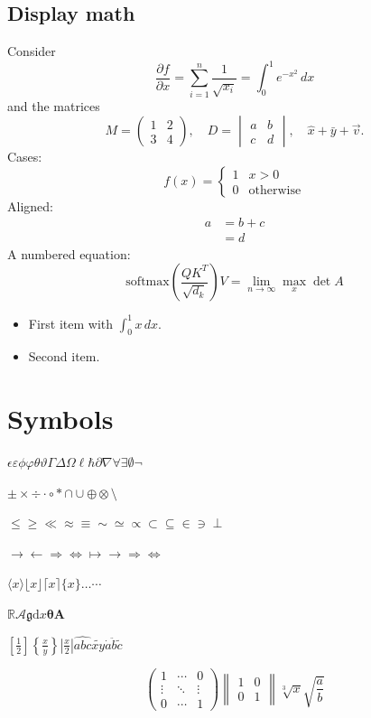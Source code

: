 \documentclass{article}
\begin{document}
\subsection{Display math}
Consider
\[ \frac{\partial f}{\partial x} = \sum_{i=1}^{n} \frac{1}{\sqrt{x_i}} = \int_0^1 e^{-x^2} \, dx \]
and the matrices
\[ M = \begin{pmatrix} 1 & 2 \\ 3 & 4 \end{pmatrix}, \quad D = \begin{vmatrix} a & b \\ c & d \end{vmatrix}, \quad \hat{x} + \bar{y} + \vec{v}. \]
Cases:
\[ f(x) = \begin{cases} 1 & x > 0 \\ 0 & \text{otherwise} \end{cases} \]
Aligned:
\begin{align*}
a &= b + c \\
  &= d
\end{align*}
A numbered equation:
\begin{equation}
\mathrm{softmax}\left(\frac{QK^T}{\sqrt{d_k}}\right)V = \lim_{n \to \infty} \max_x \det A
\end{equation}
\begin{itemize}
\item First item with $\int_0^1 x\,dx$.
\item Second item.
\end{itemize}
\newpage
\section{Symbols}
$\epsilon \varepsilon \phi \varphi \theta \vartheta \Gamma \Delta \Omega \ell \hbar \partial \nabla \forall \exists \emptyset \neg$

$\pm \times \div \cdot \circ \ast \cap \cup \oplus \otimes \setminus$

$\leq \geq \ll \approx \equiv \sim \simeq \propto \subset \subseteq \in \ni \perp$

$\to \leftarrow \Rightarrow \Leftrightarrow \mapsto \longrightarrow \Longrightarrow \iff$

$\langle x \rangle \lfloor x \rfloor \lceil x \rceil \{x\} \ldots \cdots$

$\mathbb{R} \mathcal{A} \mathfrak{g} \mathrm{d}x \boldsymbol{\theta} \mathbf{A}$

$\left[ \frac{1}{2} \right] \left\{ \frac{x}{y} \right\} \left| \frac{x}{2} \right| \widehat{abc} \widetilde{xy} \dot{a} \ddot{b} \tilde{c}$

\[ \begin{pmatrix} 1 & \cdots & 0 \\ \vdots & \ddots & \vdots \\ 0 & \cdots & 1 \end{pmatrix} \begin{Vmatrix} 1 & 0 \\ 0 & 1 \end{Vmatrix} \sqrt[3]{x} \sqrt{\frac{a}{b}} \]
\end{document}
